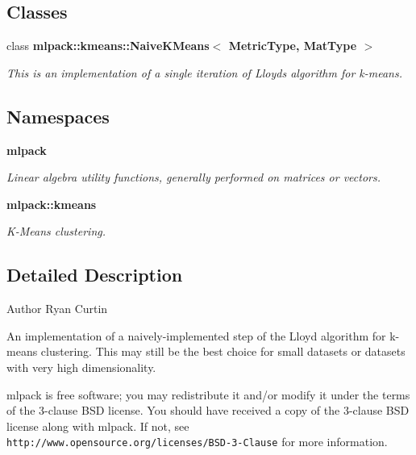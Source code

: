 \subsection*{Classes}
\begin{DoxyCompactItemize}
\item 
class {\bf mlpack\+::kmeans\+::\+Naive\+K\+Means$<$ Metric\+Type, Mat\+Type $>$}
\begin{DoxyCompactList}\small\item\em This is an implementation of a single iteration of Lloyd\textquotesingle{}s algorithm for k-\/means. \end{DoxyCompactList}\end{DoxyCompactItemize}
\subsection*{Namespaces}
\begin{DoxyCompactItemize}
\item 
 {\bf mlpack}
\begin{DoxyCompactList}\small\item\em Linear algebra utility functions, generally performed on matrices or vectors. \end{DoxyCompactList}\item 
 {\bf mlpack\+::kmeans}
\begin{DoxyCompactList}\small\item\em K-\/\+Means clustering. \end{DoxyCompactList}\end{DoxyCompactItemize}


\subsection{Detailed Description}
\begin{DoxyAuthor}{Author}
Ryan Curtin
\end{DoxyAuthor}
An implementation of a naively-\/implemented step of the Lloyd algorithm for k-\/means clustering. This may still be the best choice for small datasets or datasets with very high dimensionality.

mlpack is free software; you may redistribute it and/or modify it under the terms of the 3-\/clause B\+SD license. You should have received a copy of the 3-\/clause B\+SD license along with mlpack. If not, see {\tt http\+://www.\+opensource.\+org/licenses/\+B\+S\+D-\/3-\/\+Clause} for more information. 
